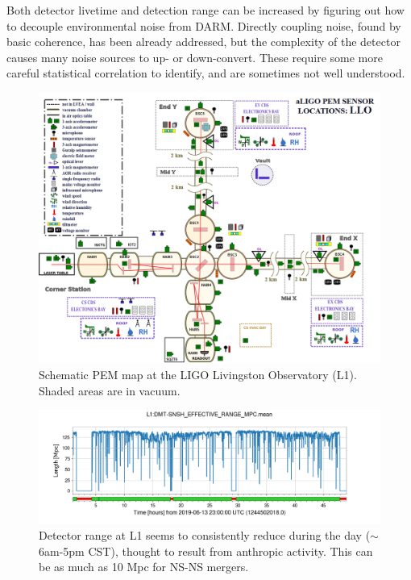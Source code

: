 \documentclass[colorlinks=true,pdfstartview=FitV,linkcolor=blue,
            citecolor=red,urlcolor=magenta]{ligodoc}
\begin{document}
Both detector livetime and detection range can be increased by figuring out how to decouple environmental noise from DARM.
Directly coupling noise, found by basic coherence, has been already addressed, but the complexity of the detector causes many noise sources to up- or down-convert.
These require some more careful statistical correlation to identify, and are sometimes not well understood.
\begin{figure}
\includegraphics[width=\textwidth]{assets/llopem.png}
\caption{Schematic PEM map at the LIGO Livingston Observatory (L1). Shaded areas are in vacuum.}
\end{figure}
\begin{figure}
  \includegraphics[width=\textwidth]{assets/L1:DMT-SNSH_EFFECTIVE_RANGE_MPC.png}
  \caption{Detector range at L1 seems to consistently reduce during the day ($\sim$6am-5pm CST), thought to result from anthropic activity. This can be as much as 10 Mpc for NS-NS mergers.}
\end{figure}
\end{document}
